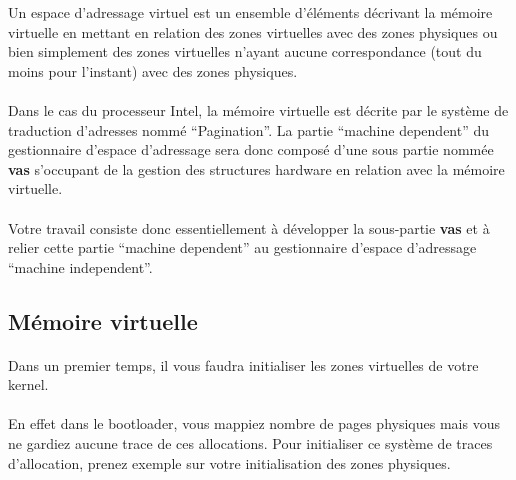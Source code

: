 \documentclass[10pt,a4wide]{article}
\begin{document}
Un espace d'adressage virtuel est un ensemble d'\'el\'ements d\'ecrivant
la m\'emoire virtuelle en mettant en relation des zones virtuelles avec des
zones physiques ou bien simplement des zones virtuelles n'ayant aucune
correspondance (tout du moins pour l'instant) avec des zones physiques.

\paragraph{}

Dans le cas du processeur Intel, la m\'emoire virtuelle est d\'ecrite
par le syst\`eme de traduction d'adresses nomm\'e ``Pagination''. La
partie ``machine dependent'' du gestionnaire d'espace d'adressage sera
donc compos\'e d'une sous partie nomm\'ee \textbf{vas} s'occupant de la
gestion des structures hardware en relation avec la m\'emoire virtuelle.

\paragraph{}

Votre travail consiste donc essentiellement \`a d\'evelopper la sous-partie
\textbf{vas} et \`a relier cette partie ``machine dependent'' au gestionnaire
d'espace d'adressage ``machine independent''.

\subsection{M\'emoire virtuelle}

\paragraph{}

Dans un premier temps, il vous faudra initialiser les zones virtuelles
de votre kernel.

\paragraph{}

En effet dans le bootloader, vous mappiez nombre de pages physiques
mais vous ne gardiez aucune trace de ces allocations. Pour initialiser
ce syst\`eme de traces d'allocation, prenez exemple sur votre
initialisation des zones physiques.

\paragraph{}
\end{document}
